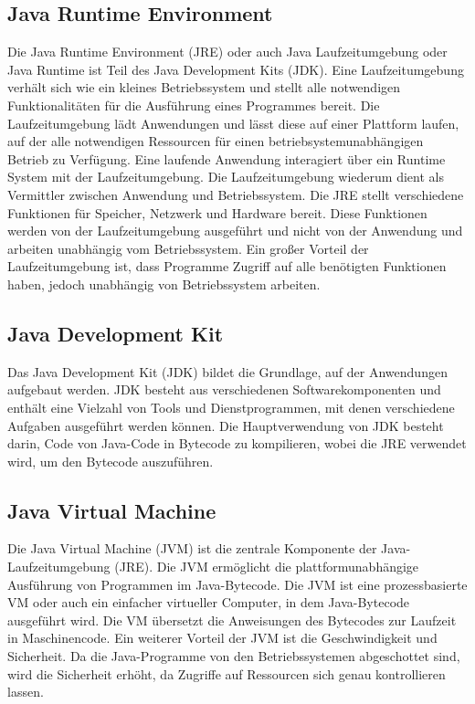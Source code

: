 \subsection{Java Runtime Environment}
Die Java Runtime Environment (JRE) oder auch Java Laufzeitumgebung oder Java Runtime ist Teil des Java 
Development Kits (JDK).
\newline
\newline
Eine Laufzeitumgebung verhält sich wie ein kleines Betriebssystem und stellt alle notwendigen
Funktionalitäten für die Ausführung eines Programmes bereit. Die Laufzeitumgebung lädt Anwendungen und
lässt diese auf einer Plattform laufen, auf der alle notwendigen Ressourcen für einen 
betriebsystemunabhängigen Betrieb zu Verfügung.
\newline
\newline
Eine laufende Anwendung interagiert über ein Runtime System mit der Laufzeitumgebung. 
Die Laufzeitumgebung wiederum dient als Vermittler zwischen Anwendung und Betriebssystem. 
Die JRE stellt verschiedene Funktionen für Speicher, Netzwerk und Hardware bereit.
Diese Funktionen werden von der Laufzeitumgebung ausgeführt und nicht von der Anwendung und arbeiten 
unabhängig vom Betriebssystem. 
\newline
\newline
Ein großer Vorteil der Laufzeitumgebung ist, dass Programme Zugriff auf alle benötigten Funktionen haben, 
jedoch unabhängig von Betriebssystem arbeiten.
~\cite{java_jre}

\subsection{Java Development Kit}
Das Java Development Kit (JDK) bildet die Grundlage, auf der Anwendungen aufgebaut werden. 
JDK besteht aus verschiedenen Softwarekomponenten und enthält eine Vielzahl von Tools und Dienstprogrammen, 
mit denen verschiedene Aufgaben ausgeführt werden können. 
Die Hauptverwendung von JDK besteht darin, Code von Java-Code in Bytecode zu kompilieren,
wobei die JRE verwendet wird, um den Bytecode auszuführen.
~\cite{java_jdk}

\subsection{Java Virtual Machine}
Die Java Virtual Machine (JVM) ist die zentrale Komponente der Java-Laufzeitumgebung (JRE). 
Die JVM ermöglicht die plattformunabhängige Ausführung von Programmen im Java-Bytecode. 
Die JVM ist eine prozessbasierte VM oder auch ein einfacher virtueller Computer, in dem Java-Bytecode
ausgeführt wird. Die VM übersetzt die Anweisungen des Bytecodes zur Laufzeit in Maschinencode.
\newline
\newline
Ein weiterer Vorteil der JVM ist die Geschwindigkeit und Sicherheit. Da die Java-Programme von den 
Betriebssystemen abgeschottet sind, wird die Sicherheit erhöht, da Zugriffe auf Ressourcen sich genau
kontrollieren lassen.
~\cite{java_jvm}

